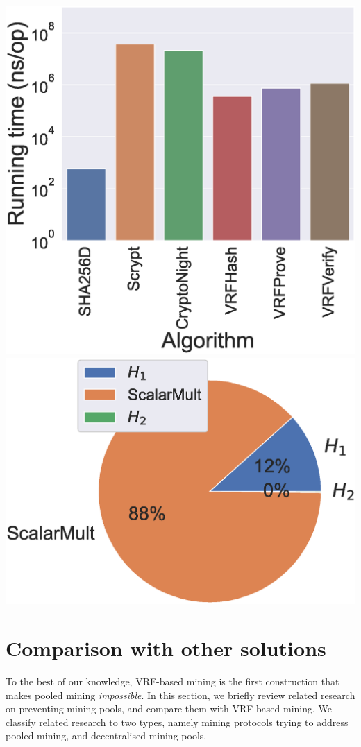 \documentclass[a0,portrait]{a0poster}
\begin{document}
\begin{multicols}{2}
    \begin{center}\vspace{1cm}
        \includegraphics[width=.45\linewidth]{figs/runtime-comparison.eps}
        \includegraphics[width=.45\linewidth]{figs/runtime-breakdown.eps}
    \end{center}\vspace{1cm}


    \section*{Comparison with other solutions}

    To the best of our knowledge, VRF-based mining is the first construction that makes pooled mining \textit{impossible}.
    In this section, we briefly review related research on preventing mining pools, and compare them with VRF-based mining.
    We classify related research to two types, namely mining protocols trying to address pooled mining, and decentralised mining pools.


\end{multicols}
\end{document}
